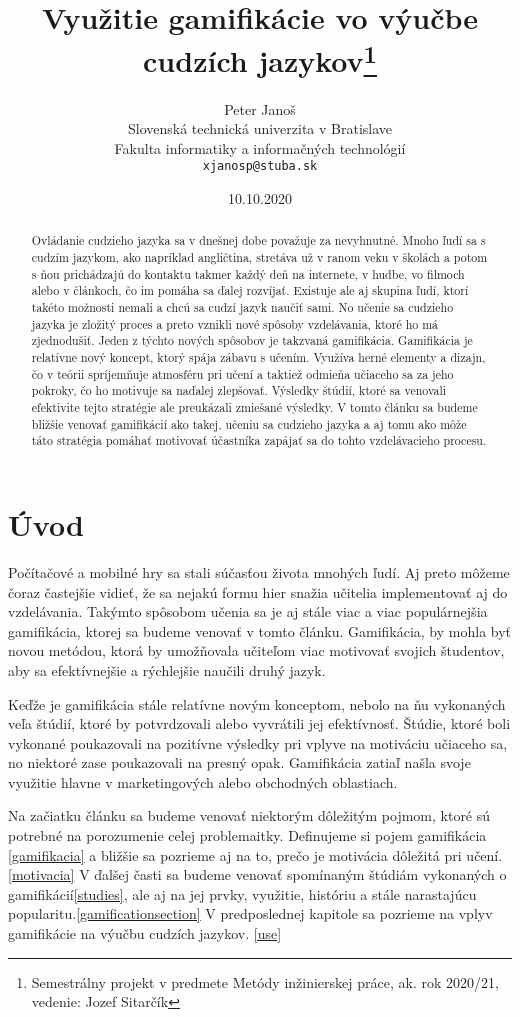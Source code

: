 \documentclass[10pt,oneside,slovak,a4paper]{article}
\title{Využitie gamifikácie vo výučbe cudzích jazykov\thanks{Semestrálny projekt v predmete Metódy inžinierskej práce, ak. rok 2020/21, vedenie: Jozef Sitarčík}} %
\author{Peter Janoš\\[2pt]
	{\small Slovenská technická univerzita v Bratislave}\\
	{\small Fakulta informatiky a informačných technológií}\\
	{\small \texttt{xjanosp@stuba.sk}}
	}
\date{\small 10.10.2020} %
\begin{document}
\maketitle

\begin{abstract}
Ovládanie cudzieho jazyka sa v dnešnej dobe považuje za nevyhnutné. Mnoho ľudí sa s cudzím jazykom, ako napríklad angličtina, stretáva už v ranom veku v školách a potom s ňou prichádzajú do kontaktu takmer každý deň na internete, v hudbe, vo filmoch alebo v článkoch, čo im pomáha sa ďalej rozvíjať. Existuje ale aj skupina ľudí, ktorí takéto možnosti nemali a chcú sa cudzí jazyk naučiť sami. No učenie sa cudzieho jazyka je zložitý proces a preto vznikli nové spôsoby vzdelávania, ktoré ho má zjednodušiť. Jeden z týchto nových spôsobov je takzvaná gamifikácia. Gamifikácia je relatívne nový koncept, ktorý spája zábavu s učením. Využíva herné elementy a dizajn, čo v teórii spríjemňuje atmosféru pri učení a taktiež odmieňa učiaceho sa za jeho pokroky, čo ho motivuje sa naďalej zlepšovať. Výsledky štúdií, ktoré sa venovali efektivite tejto stratégie ale preukázali zmiešané výsledky. V tomto článku sa budeme bližšie venovať gamifikácií ako takej, učeniu sa cudzieho jazyka a aj tomu ako môže táto stratégia pomáhať motivovať účastníka zapájať sa do tohto vzdelávacieho procesu.
\end{abstract}

\section{Úvod} \label{uvod}
Počítačové a mobilné hry sa stali súčasťou života mnohých ľudí. Aj preto môžeme čoraz častejšie vidieť, že sa nejakú formu hier snažia učitelia implementovať aj do vzdelávania. Takýmto spôsobom učenia sa je aj stále viac a viac populárnejšia gamifikácia, ktorej sa budeme venovať v tomto článku. Gamifikácia, by mohla byť novou metódou, ktorá by umožňovala učiteľom viac motivovať svojich študentov, aby sa efektívnejšie a rýchlejšie naučili druhý jazyk. 

Keďže je gamifikácia stále relatívne novým konceptom, nebolo na ňu vykonaných veľa štúdií, ktoré by potvrdzovali alebo vyvrátili jej efektívnosť. Štúdie, ktoré boli vykonané poukazovali na pozitívne výsledky pri vplyve na motiváciu učiaceho sa, no niektoré zase poukazovali na presný opak. Gamifikácia zatiaľ našla svoje využitie hlavne v marketingových alebo obchodných oblastiach.
~\cite{garland2015gamification}

Na začiatku článku sa budeme venovať niektorým dôležitým pojmom, ktoré sú potrebné na porozumenie celej problemaitky. Definujeme si pojem gamifikácia \ref{gamifikacia} a bližšie sa pozrieme aj na to, prečo je motivácia dôležitá pri učení.\ref{motivacia} V ďalšej časti sa budeme venovať spomínaným štúdiám vykonaných o gamifikácií\ref{studies}, ale aj na jej prvky, využitie, históriu a stále narastajúcu popularitu.\ref{gamificationsection} V predposlednej kapitole sa pozrieme na vplyv gamifikácie na výučbu cudzích jazykov. \ref{use}
\end{document}
